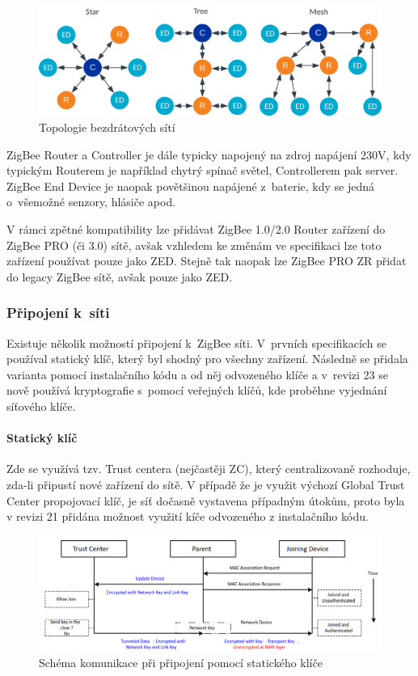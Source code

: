 \documentclass[a4paper,10pt,titlepage]{article}
\begin{document}
\begin{figure}[h] \label{fig:wlan_topology}
	\centering
	\includegraphics[width=\textwidth]{assets/topology_types.png}
	\caption[Topologie bezdrátových sítí]{Topologie bezdrátových sítí~\cite{nordic-guide}}
\end{figure}

ZigBee Router a Controller je dále typicky napojený na zdroj napájení 230V, kdy typickým Routerem je například chytrý spínač světel, Controllerem pak server. ZigBee End Device je naopak povětšinou napájené z~baterie, kdy se jedná o~všemožné senzory, hlásiče  apod.

V rámci zpětné kompatibility lze přidávat ZigBee 1.0/2.0 Router zařízení do ZigBee PRO (či 3.0) sítě, avšak vzhledem ke změnám ve specifikaci lze toto zařízení používat pouze jako ZED. Stejně tak naopak lze ZigBee PRO ZR přidat do legacy ZigBee sítě, avšak pouze jako ZED.

\subsubsection{Připojení k~síti} \label{sec:joining}
Existuje několik možností připojení k~ZigBee síti. V~prvních specifikacích se používal statický klíč, který byl shodný pro všechny zařízení. Následně se přidala varianta pomocí instalačního kódu a od něj odvozeného klíče a v~revizi 23 se nově používá kryptografie s~pomocí veřejných klíčů, kde proběhne vyjednání síťového klíče.

\paragraph{Statický klíč}
Zde se využívá tzv. Trust centera (nejčastěji ZC), který centralizovaně rozhoduje, zda-li připustí nové zařízení do sítě. V případě že je využit výchozí Global Trust Center propojovací klíč, je síť dočasně vystavena případným útokům, proto byla v revizi 21 přidána možnost využití kíče odvozeného z instalačního kódu.

\begin{figure}[h] \label{fig:join_static}
	\centering
	\includegraphics[width=\textwidth]{assets/join_static}
	\caption[Schéma komunikace při připojení pomocí statického klíče]{Schéma komunikace při připojení pomocí statického klíče~\cite{silabs-an1233}}
\end{figure}
\end{document}
